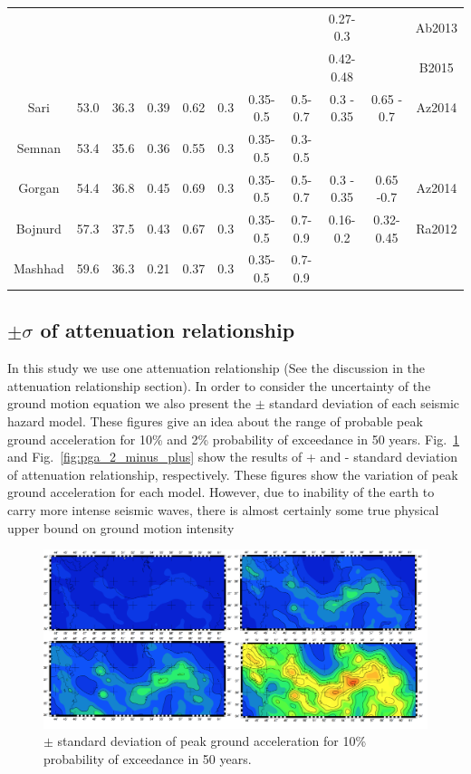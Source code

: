 \begin{table}[!ht]
\begin{tabular}{ | c | c | c | c | c | c | c | c | c | c | c |}
	 \cline{9-11}	             &  &  &  &  &  &  & & 0.27-0.3  &  & Ab2013\\ 
	 \cline{9-11}	             &  &  &  &  &  &  & & 0.42-0.48 &  & B2015\\ \hline
	 Sari          & 53.0   & 36.3   & 0.39   & 0.62  & 0.3 & 0.35-0.5 &0.5-0.7& 0.3 - 0.35 &  0.65 - 0.7 & Az2014\\ \hline
	 Semnan   & 53.4   & 35.6   & 0.36   & 0.55  & 0.3 & 0.35-0.5 &0.3-0.5&  & & \\ \hline
	 Gorgan    & 54.4   & 36.8    & 0.45  & 0.69  & 0.3 & 0.35-0.5 &0.5-0.7& 0.3 - 0.35 &  0.65 -0.7 & Az2014\\ \hline
	 Bojnurd   & 57.3    & 37.5    & 0.43  & 0.67  & 0.3 & 0.35-0.5 &0.7-0.9&0.16-0.2  & 0.32-0.45  & Ra2012  \\ \hline
	 Mashhad & 59.6     & 36.3   & 0.21 & 0.37  & 0.3 & 0.35-0.5 &0.7-0.9  &  &&  \\ \hline
 
\end{tabular}
\label{tab:pga_values}
\end{table}



\subsection{$\pm \sigma$ of attenuation relationship}
In this study we use one attenuation relationship (See the discussion in the attenuation relationship section). In order to consider the uncertainty of the ground motion equation we also present the $\pm$ standard deviation of each seismic hazard model. These figures give an idea about the range of probable peak ground acceleration for 10\% and 2\% probability of exceedance in 50 years. Fig.~\ref{fig:pga_10_minus_plus} and Fig.~\ref{fig:pga_2_minus_plus} show the results of + and - standard deviation of attenuation relationship, respectively. These figures show the variation of peak ground acceleration for each model. However, due to inability of the earth to carry more intense seismic waves, there is almost certainly some true physical upper bound on ground motion intensity \citep{Baker2008}


\begin{figure} [!ht]
\centering
\includegraphics[scale=0.15]{figures/pdf/pga_10_minus_plus.pdf} 
\caption{$\pm$ standard deviation of peak ground acceleration for 10\% probability of exceedance in 50 years.}
\label{fig:pga_10_minus_plus}
\end{figure}


